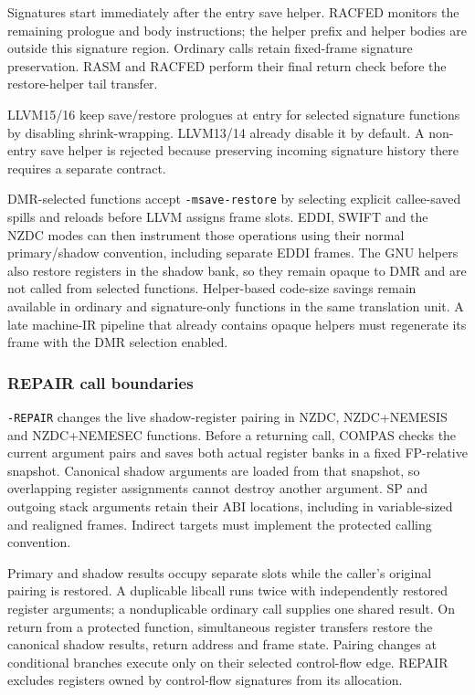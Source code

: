 Signatures start immediately after the entry save helper. RACFED monitors the
remaining prologue and body instructions; the helper prefix and helper bodies
are outside this signature region. Ordinary calls retain fixed-frame signature
preservation. RASM and RACFED perform their final return check before the
restore-helper tail transfer.

LLVM15/16 keep save/restore prologues at entry for selected signature functions
by disabling shrink-wrapping. LLVM13/14 already disable it by default.
A non-entry save helper is rejected because preserving incoming signature
history there requires a separate contract.

DMR-selected functions accept \texttt{-msave-restore} by selecting explicit
callee-saved spills and reloads before LLVM assigns frame slots. EDDI, SWIFT
and the NZDC modes can then instrument those operations using their normal
primary/shadow convention, including separate EDDI frames. The GNU helpers
also restore registers in the shadow bank, so they remain opaque to DMR and
are not called from selected functions. Helper-based code-size savings remain
available in ordinary and signature-only functions in the same translation
unit. A late machine-IR pipeline that already contains opaque helpers must
regenerate its frame with the DMR selection enabled.

\subsubsection{REPAIR call boundaries}
\texttt{-REPAIR} changes the live shadow-register pairing in NZDC,
NZDC+NEMESIS and NZDC+NEMESEC functions. Before a returning call, COMPAS checks
the current argument pairs and saves both actual register banks in a fixed
FP-relative snapshot. Canonical shadow arguments are loaded from that snapshot,
so overlapping register assignments cannot destroy another argument. SP and
outgoing stack arguments retain their ABI locations, including in variable-sized
and realigned frames. Indirect targets must implement the protected calling
convention.

Primary and shadow results occupy separate slots while the caller's original
pairing is restored. A duplicable libcall runs twice with independently restored
register arguments; a nonduplicable ordinary call supplies one shared result.
On return from a protected function, simultaneous register transfers restore
the canonical shadow results, return address and frame state. Pairing changes
at conditional branches execute only on their selected control-flow edge.
REPAIR excludes registers owned by control-flow signatures from its allocation.

